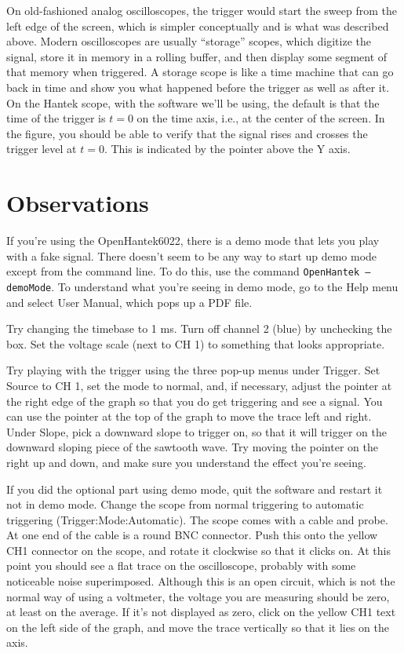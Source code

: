 On old-fashioned analog oscilloscopes, the trigger would start
the sweep from the left edge of the screen, which is simpler
conceptually and is what was described above. Modern oscilloscopes
are usually ``storage'' scopes, which digitize the signal,
store it in memory in a rolling buffer, and then display some
segment of that memory when triggered. A storage scope is
like a time machine that can go back in time and show you
what happened before the trigger as well as after it. On
the Hantek scope, with the software we'll be using, the default is
that the time of the trigger is $t=0$ on the time axis, i.e., at
the center of the screen. In the figure, you should be able to
verify that the signal rises and crosses the trigger level at $t=0$.
This is indicated by the pointer above the Y axis.

\section*{Observations}


If you're using the OpenHantek6022, there is a demo mode that lets you play with
a fake signal. There doesn't seem to be any way to start up demo mode except from
the command line. To do this, use the command \texttt{OpenHantek --demoMode}.
To understand what you're seeing in demo mode, go to the Help menu and select
User Manual, which pops up a PDF file.

Try changing the timebase to 1 ms. Turn off channel 2 (blue) by unchecking the
box. Set the voltage scale (next to CH 1) to something that looks appropriate.

Try playing with the trigger using the three pop-up menus under Trigger.
Set Source to CH 1, set the mode to normal, and, if necessary, adjust the
pointer at the right edge of the graph so that you do get triggering and
see a signal. You can use the pointer at the top of the graph to move the
trace left and right. Under Slope, pick a downward slope to trigger on, so
that it will trigger on the downward sloping piece of the sawtooth wave.
Try moving the pointer on the right up and down, and make sure you understand
the effect you're seeing.


If you did the optional part using demo mode, quit the software and restart it not
in demo mode.
Change the scope from normal triggering to automatic triggering (Trigger:Mode:Automatic).
The scope comes with a cable and probe. At one end of the cable is a round BNC
connector. Push this onto the yellow CH1 connector on the scope, and rotate it
clockwise so that it clicks on. 
At this point you should see a flat trace on the oscilloscope, probably with some
noticeable noise superimposed.
Although this is an open circuit, which is not the normal way of using a voltmeter,
the voltage you are measuring should be zero, at least on the average. If it's
not displayed as zero, click on the yellow CH1 text on the left side of the graph,
and move the trace vertically so that it lies on the axis.

